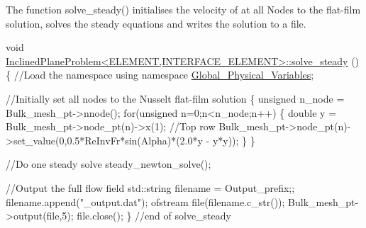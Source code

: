The function {\ttfamily solve\+\_\+steady()} initialises the velocity of at all {\ttfamily Nodes} to the flat-\/film solution, solves the steady equations and writes the solution to a file. 
\begin{DoxyCodeInclude}
\textcolor{keywordtype}{void} \hyperlink{classInclinedPlaneProblem_a0e2fcfdb8230df82729ba7d728e58040}{InclinedPlaneProblem<ELEMENT,INTERFACE\_ELEMENT>::solve\_steady}
      ()
\{
 \textcolor{comment}{//Load the namespace}
 \textcolor{keyword}{using namespace }\hyperlink{namespaceGlobal__Physical__Variables}{Global\_Physical\_Variables};
 
 \textcolor{comment}{//Initially set all nodes to the Nusselt flat-film solution}
 \{
  \textcolor{keywordtype}{unsigned} n\_node = Bulk\_mesh\_pt->nnode();
  \textcolor{keywordflow}{for}(\textcolor{keywordtype}{unsigned}  n=0;n<n\_node;n++)
   \{
    \textcolor{keywordtype}{double} y = Bulk\_mesh\_pt->node\_pt(n)->x(1);
    \textcolor{comment}{//Top row}
    Bulk\_mesh\_pt->node\_pt(n)->set\_value(0,0.5*ReInvFr*sin(Alpha)*(2.0*y - y*y));
   \}
 \}
 
 \textcolor{comment}{//Do one steady solve}
 steady\_newton\_solve();

 \textcolor{comment}{//Output the full flow field}
 std::string filename = Output\_prefix;;
 filename.append(\textcolor{stringliteral}{"\_output.dat"});
 ofstream file(filename.c\_str());
 Bulk\_mesh\_pt->output(file,5);
 file.close();
\} \textcolor{comment}{//end of solve\_steady}

\end{DoxyCodeInclude}


